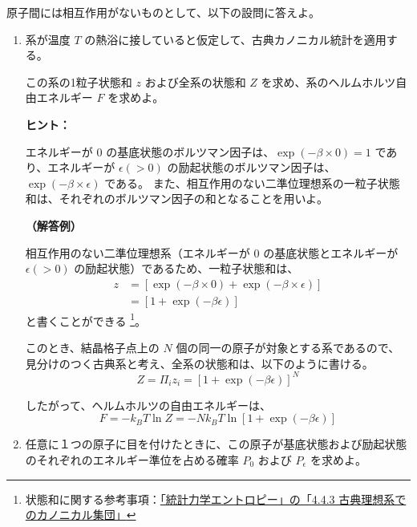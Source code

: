 \documentclass[uplatex,dvipdfmx,a4paper,11pt]{jsarticle}
\begin{document}
原子間には相互作用がないものとして、以下の設問に答えよ。

\begin{enumerate}
\setlength{\parskip}{0cm} %
\setlength{\itemsep}{0.3cm} %

\item
系が温度 $T$ の熱浴に接していると仮定して、古典カノニカル統計を適用する。

この系の1粒子状態和 $z$ および全系の状態和 $Z$ を求め、系のヘルムホルツ自由エネルギー $F$ を求めよ。
\vspace{8pt}

\begin{itembox}[l]{{\bf ヒント：}}

エネルギーが $0$ の基底状態のボルツマン因子は、$\exp(-\beta \times 0) = 1$ であり、エネルギーが $\epsilon (>0)$ の励起状態のボルツマン因子は、$\exp(-\beta \times \epsilon)$ である。
また、相互作用のない二準位理想系の一粒子状態和は、それぞれのボルツマン因子の和となることを用いよ。

\end{itembox}

{\bf （解答例）}

相互作用のない二準位理想系（エネルギーが $0$ の基底状態とエネルギーが $\epsilon (>0)$ の励起状態）であるため、一粒子状態和は、
\begin{align*}
z 
	&= [\exp(-\beta \times 0) + \exp(-\beta \times \epsilon)] \\
	&= [1 + \exp(-\beta \epsilon)]
\end{align*}
と書くことができる
\footnote{
状態和に関する参考事項：\href{http://kisokouza.island.ac/documents/Stat_Phys_Entropy.pdf}{「統計力学エントロピー」の「4.4.3 古典理想系でのカノニカル集団」}
}。

このとき、結晶格子点上の $N$ 個の同一の原子が対象とする系であるので、見分けのつく古典系と考え、全系の状態和は、以下のように書ける。
\begin{equation*}
Z = \Pi_i z_i = [1 + \exp(-\beta \epsilon)]^N
\end{equation*}

したがって、ヘルムホルツの自由エネルギーは、
\begin{equation*}
F = - k_BT \ln Z = -N k_B T \ln  [1 + \exp(-\beta \epsilon)]
\end{equation*}
\newpage

\item
任意に１つの原子に目を付けたときに、この原子が基底状態および励起状態のそれぞれのエネルギー準位を占める確率 $P_0$ および $P_{\epsilon}$ を求めよ。
\vspace{8pt}


\end{enumerate}
\end{document}
